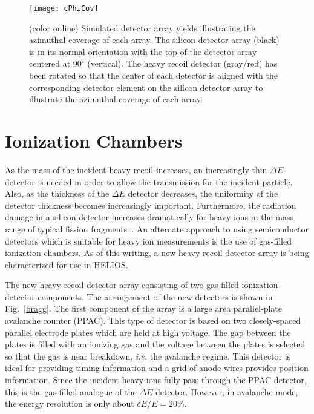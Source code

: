 \begin{figure}%
\centering
\texttt{[image: cPhiCov]}%
\caption[Simulated detector array yields illustrating the azimuthal coverage of each array]{(color online) Simulated detector array yields illustrating the azimuthal coverage of each array.  The silicon detector array (black) is in its normal orientation with the top of the detector array centered at 90$^\circ$ (vertical).  The heavy recoil detector (gray/red) has been rotated so that the center of each detector is aligned with the corresponding detector element on the silicon detector array to illustrate the azimuthal coverage of each array.  }%
\label{fig_phase}%
\end{figure}

\section{Ionization Chambers}
As the mass of the incident heavy recoil increases, an increasingly thin $\Delta E$ detector is needed in order to allow the transmission for the incident particle.  Also, as the thickness of the $\Delta E$ detector decreases, the uniformity of the detector thickness becomes increasingly important.  Furthermore, the radiation damage in a silicon detector increases dramatically for heavy ions in the mass range of typical fission fragments~\cite{Knoll_1979}.  An alternate approach to using semiconductor detectors which is suitable for heavy ion measurements is the use of gas-filled ionization chambers.  As of this writing, a new heavy recoil detector array is being characterized for use in HELIOS.

The new heavy recoil detector array consisting of two gas-filled ionization detector components.  The arrangement of the new detectors is shown in Fig.~\ref{bragg}.  The first component of the array is a large area parallel-plate avalanche counter (PPAC).  This type of detector is based on two closely-spaced parallel electrode plates which are held at high voltage.  The gap between the plates is filled with an ionizing gas and the voltage between the plates is selected so that the gas is near breakdown, \textit{i.e.} the avalanche regime.  This detector is ideal for providing timing information and a grid of anode wires provides position information.  Since the incident heavy ions fully pass through the PPAC detector, this is the gas-filled analogue of the $\Delta E$ detector.  However, in avalanche mode, the energy resolution is only about $\delta E/E = 20$\%.

